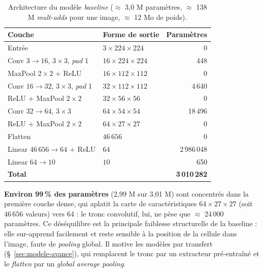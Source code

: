 \begin{table}[H]
  \centering
  \small
  \setlength{\tabcolsep}{5pt}
  \renewcommand{\arraystretch}{1.15}
  \begin{tabular}{@{}llr@{}}
    \toprule
    Couche & Forme de sortie & Paramètres \\
    \midrule
    Entrée                                   & $3 \times 224 \times 224$   & 0 \\
    Conv $3 \to 16$, $3\times3$, \emph{pad} 1 & $16 \times 224 \times 224$  & 448 \\
    MaxPool $2\times2$ + ReLU                 & $16 \times 112 \times 112$  & 0 \\
    Conv $16 \to 32$, $3\times3$, \emph{pad} 1 & $32 \times 112 \times 112$ & 4\,640 \\
    ReLU + MaxPool $2\times2$                 & $32 \times 56 \times 56$    & 0 \\
    Conv $32 \to 64$, $3\times3$              & $64 \times 54 \times 54$    & 18\,496 \\
    ReLU + MaxPool $2\times2$                 & $64 \times 27 \times 27$    & 0 \\
    Flatten                                   & $46\,656$                  & 0 \\
    Linear $46\,656 \to 64$ + ReLU           & $64$                        & 2\,986\,048 \\
    Linear $64 \to 10$                        & $10$                       & 650 \\
    \midrule
    \textbf{Total}                            &                            & \textbf{3\,010\,282} \\
    \bottomrule
  \end{tabular}
  \caption{Architecture du modèle \emph{baseline} ($\approx$ 3,0 M paramètres, $\approx$ 138 M \emph{mult-adds} pour une image, $\approx$ 12 Mo de poids).}
  \label{tab:baseline-archi}
\end{table}

\textbf{Environ 99\,\% des paramètres} (2,99 M sur 3,01 M) sont concentrés dans la première couche dense, qui aplatit la carte de caractéristiques $64 \times 27 \times 27$ (soit $46\,656$ valeurs) vers 64 : le tronc convolutif, lui, ne pèse que $\approx$ 24\,000 paramètres.
Ce déséquilibre est la principale faiblesse structurelle de la baseline : elle sur-apprend facilement et reste sensible à la position de la cellule dans l’image, faute de \emph{pooling} global.
Il motive les modèles par transfert (\S~\ref{sec:modele-avance}), qui remplacent le tronc par un extracteur pré-entraîné et le \emph{flatten} par un \emph{global average pooling}.

